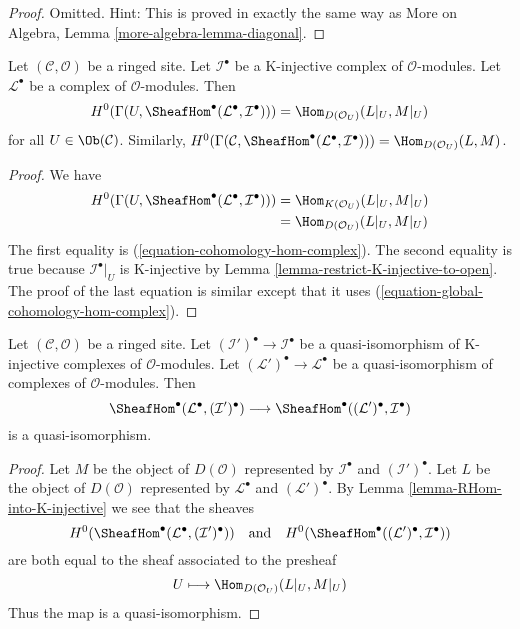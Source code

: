 \begin{proof}
Omitted. Hint: This is proved in exactly the same way as
More on Algebra, Lemma \ref{more-algebra-lemma-diagonal}.
\end{proof}

\begin{lemma}
\label{lemma-RHom-into-K-injective}
Let $(\mathcal{C}, \mathcal{O})$ be a ringed site. Let $\mathcal{I}^\bullet$
be a K-injective complex of $\mathcal{O}$-modules. Let
$\mathcal{L}^\bullet$ be a complex of $\mathcal{O}$-modules.
Then
$$
H^0(\Gamma(U, \SheafHom^\bullet(\mathcal{L}^\bullet, \mathcal{I}^\bullet))) =
\Hom_{D(\mathcal{O}_U)}(L|_U, M|_U)
$$
for all $U \in \Ob(\mathcal{C})$. Similarly,
$H^0(\Gamma(\mathcal{C},
\SheafHom^\bullet(\mathcal{L}^\bullet, \mathcal{I}^\bullet))) =
\Hom_{D(\mathcal{O}_U)}(L, M)$.
\end{lemma}

\begin{proof}
We have
\begin{align*}
H^0(\Gamma(U, \SheafHom^\bullet(\mathcal{L}^\bullet, \mathcal{I}^\bullet)))
& =
\Hom_{K(\mathcal{O}_U)}(L|_U, M|_U) \\
& =
\Hom_{D(\mathcal{O}_U)}(L|_U, M|_U)
\end{align*}
The first equality is (\ref{equation-cohomology-hom-complex}).
The second equality is true because $\mathcal{I}^\bullet|_U$
is K-injective by Lemma \ref{lemma-restrict-K-injective-to-open}.
The proof of the last equation is similar except that it uses
(\ref{equation-global-cohomology-hom-complex}).
\end{proof}

\begin{lemma}
\label{lemma-RHom-well-defined}
Let $(\mathcal{C}, \mathcal{O})$ be a ringed site. Let
$(\mathcal{I}')^\bullet \to \mathcal{I}^\bullet$
be a quasi-isomorphism of K-injective complexes of $\mathcal{O}$-modules.
Let $(\mathcal{L}')^\bullet \to \mathcal{L}^\bullet$
be a quasi-isomorphism of complexes of $\mathcal{O}$-modules.
Then
$$
\SheafHom^\bullet(\mathcal{L}^\bullet, (\mathcal{I}')^\bullet)
\longrightarrow
\SheafHom^\bullet((\mathcal{L}')^\bullet, \mathcal{I}^\bullet)
$$
is a quasi-isomorphism.
\end{lemma}

\begin{proof}
Let $M$ be the object of $D(\mathcal{O})$ represented by
$\mathcal{I}^\bullet$ and $(\mathcal{I}')^\bullet$.
Let $L$ be the object of $D(\mathcal{O})$ represented by
$\mathcal{L}^\bullet$ and $(\mathcal{L}')^\bullet$.
By Lemma \ref{lemma-RHom-into-K-injective}
we see that the sheaves
$$
H^0(\SheafHom^\bullet(\mathcal{L}^\bullet, (\mathcal{I}')^\bullet))
\quad\text{and}\quad
H^0(\SheafHom^\bullet((\mathcal{L}')^\bullet, \mathcal{I}^\bullet))
$$
are both equal to the sheaf associated to the presheaf
$$
U \longmapsto \Hom_{D(\mathcal{O}_U)}(L|_U, M|_U)
$$
Thus the map is a quasi-isomorphism.
\end{proof}

